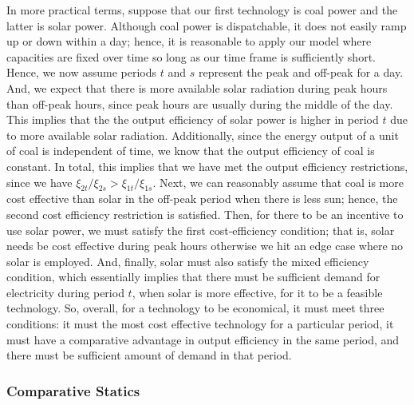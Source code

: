 \documentclass[11pt,a4paper]{extarticle}
\begin{document}
In more practical terms, suppose that our first technology is coal power and the latter is solar power. Although coal power is dispatchable, it does not easily ramp up or down within a day; hence, it is reasonable to apply our model where capacities are fixed over time so long as our time frame is sufficiently short. Hence, we now assume periods $t$ and $s$ represent the peak and off-peak for a day. And, we expect that there is more available solar radiation during peak hours than off-peak hours, since peak hours are usually during the middle of the day. This implies that the the output efficiency of solar power is higher in period $t$ due to more available solar radiation. Additionally, since the energy output of a unit of coal is independent of time, we know that the output efficiency of coal is constant. In total, this implies that we have met the output efficiency restrictions, since we have $\xi_{2t}/\xi_{2s} > \xi_{1t}/\xi_{1s}$. Next, we can reasonably assume that coal is more cost effective than solar in the off-peak period when there is less sun; hence, the second cost efficiency restriction is satisfied. Then, for there to be an incentive to use solar power, we must satisfy the first cost-efficiency condition; that is, solar needs be cost effective during peak hours otherwise we hit an edge case where no solar is employed. And, finally, solar must also satisfy the mixed efficiency condition, which essentially implies that there must be sufficient demand for electricity during period $t$, when solar is more effective, for it to be a feasible technology. So, overall, for a technology to be economical, it must meet three conditions: it must the most cost effective technology for a particular period, it must have a comparative advantage in output efficiency in the same period, and there must be sufficient amount of demand in that period. 



\subsubsection{Comparative Statics}
\end{document}
